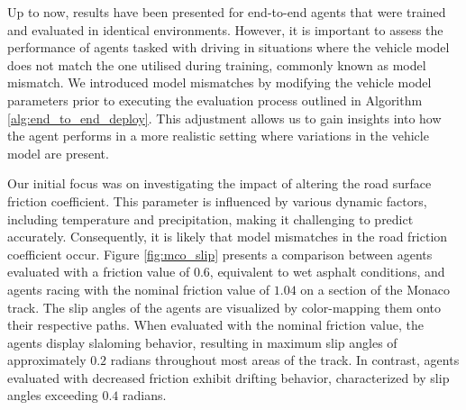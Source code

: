 Up to now, results have been presented for end-to-end agents that were trained and evaluated in identical environments. 
However, it is important to assess the performance of agents tasked with driving in situations where the vehicle model does not match the one utilised during training, commonly known as model mismatch.
We introduced model mismatches by modifying the vehicle model parameters prior to executing the evaluation process outlined in Algorithm \ref{alg:end_to_end_deploy}. 
This adjustment allows us to gain insights into how the agent performs in a more realistic setting where variations in the vehicle model are present.


Our initial focus was on investigating the impact of altering the road surface friction coefficient.
This parameter is influenced by various dynamic factors, including temperature and precipitation, making it challenging to predict accurately.
Consequently, it is likely that model mismatches in the road friction coefficient occur.
Figure \ref{fig:mco_slip} presents a comparison between agents evaluated with a friction value of $0.6$, equivalent to wet asphalt conditions, and agents racing with the nominal friction value of $1.04$ on a section of the Monaco track. 
The slip angles of the agents are visualized by color-mapping them onto their respective paths. 
When evaluated with the nominal friction value, the agents display slaloming behavior, resulting in maximum slip angles of approximately $0.2$ radians throughout most areas of the track. 
In contrast, agents evaluated with decreased friction exhibit drifting behavior, characterized by slip angles exceeding $0.4$ radians. 


